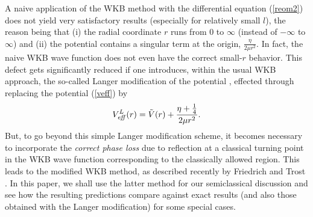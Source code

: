 \documentclass[a4paper,aps,eqsecnum,preprint,preprintnumbers,12pt]{revtex4}
\begin{document}
A naive application of the WKB method with the differential
equation (\ref{reom2}) does not yield very satisfactory results
(especially for relatively small $l$), the reason being that (i)
the radial coordinate $r$ runs from 0 to $\infty$ (instead of
$-\infty$ to $\infty$) and (ii) the potential contains a singular
term at the origin, $\displaystyle \frac{\eta}{2\mu r^{2}}$. In
fact, the naive WKB wave function does not even have the correct
small-$r$ behavior. This defect gets significantly reduced if one
introduces, within the usual WKB approach, the so-called Langer
modification of the potential \cite{langer}, effected through
replacing the potential (\ref{veff}) by
\begin{equation}
V_{\it eff}^{L}(r) = \tilde{V}(r) + \frac{ \eta + \frac{1}{4} }{
2\mu r^{2} }.
\end{equation}
But, to go beyond this simple Langer modification scheme, it
becomes necessary to incorporate the {\it correct phase loss} due
to reflection at a classical turning point in the WKB wave
function corresponding to the classically allowed region. This
leads to the modified WKB method, as described recently by
Friedrich and Trost \cite{friedrich}. In this paper, we shall use
the latter method for our semiclassical discussion and see how the
resulting predictions compare against exact results (and also
those obtained with the Langer modification) for some special
cases.
\end{document}
